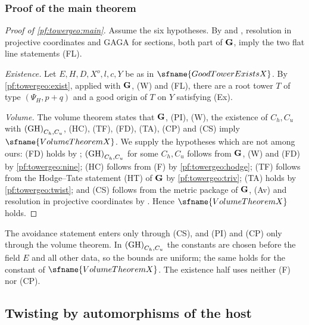\subsubsection*{Proof of the main theorem}

\begin{proof}[Proof of \cref{pf:towergeo:main}]
Assume the six hypotheses. By  and
, resolution in projective coordinates and
GAGA for sections, both part of $\mathbf G$, imply the two flat line statements (FL).

\emph{Existence.} Let $E,H,D,X^o,l,c,Y$ be as in $\sfname{GoodTowerExistsX}$. By
\cref{pf:towergeo:exist}, applied with $\mathbf G$, (W) and (FL), there are a root tower $T$ of type
$(\Psi_H,p+q)$ and a good origin of $T$ on $Y$ satisfying (Ex).

\emph{Volume.} The volume theorem  states that
$\mathbf G$, (PI), (W), the existence of $C_h,C_u$ with $\textup{(GH)}_{C_h,C_u}$, (HC), (TF), (FD), (TA),
(CP) and (CS) imply $\sfname{VolumeTheoremX}$. We supply the hypotheses which are not among ours: (FD)
holds by ; $\textup{(GH)}_{C_h,C_u}$ for some $C_h,C_u$ follows
from $\mathbf G$, (W) and (FD) by \cref{pf:towergeo:nine}; (HC) follows from (F) by
\cref{pf:towergeo:hodge}; (TF) follows from the Hodge--Tate statement (HT) of $\mathbf G$ by
\cref{pf:towergeo:triv}; (TA) holds by \cref{pf:towergeo:twist}; and (CS) follows from the metric package of
$\mathbf G$, (Av) and resolution in projective coordinates by
. Hence $\sfname{VolumeTheoremX}$ holds.
\end{proof}

\begin{remark}\label{pf:towergeo:rem-hyps}
The avoidance statement enters only through (CS), and (PI) and (CP) only through the volume theorem.
In $\textup{(GH)}_{C_h,C_u}$ the constants are chosen before the field $E$ and all other data, so the bounds
are uniform; the same holds for the constant of $\sfname{VolumeTheoremX}$. The existence half uses
neither (F) nor (CP).
\end{remark}

\subsection{Twisting by automorphisms of the host}\label{pf:towergeo:sec-twist}

